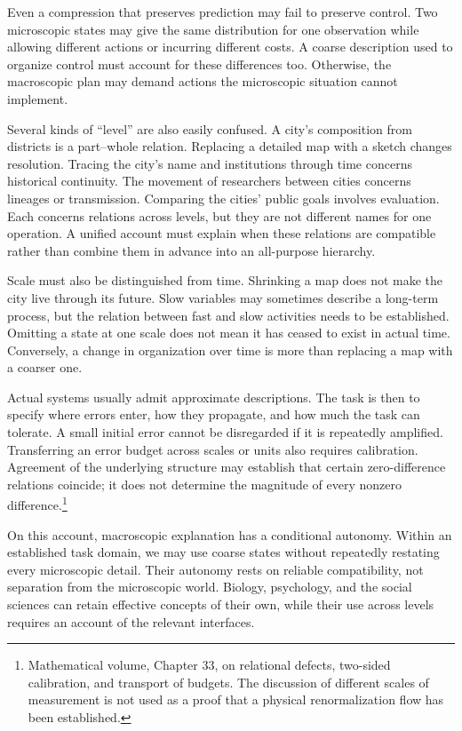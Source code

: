 \documentclass[
  english,
  11pt,
  oneside]{book}
\begin{document}
Even a compression that preserves prediction may fail to preserve control. Two microscopic states may give the same distribution for one observation while allowing different actions or incurring different costs. A coarse description used to organize control must account for these differences too. Otherwise, the macroscopic plan may demand actions the microscopic situation cannot implement.

Several kinds of ``level'' are also easily confused. A city's composition from districts is a part--whole relation. Replacing a detailed map with a sketch changes resolution. Tracing the city's name and institutions through time concerns historical continuity. The movement of researchers between cities concerns lineages or transmission. Comparing the cities' public goals involves evaluation. Each concerns relations across levels, but they are not different names for one operation. A unified account must explain when these relations are compatible rather than combine them in advance into an all-purpose hierarchy.

Scale must also be distinguished from time. Shrinking a map does not make the city live through its future. Slow variables may sometimes describe a long-term process, but the relation between fast and slow activities needs to be established. Omitting a state at one scale does not mean it has ceased to exist in actual time. Conversely, a change in organization over time is more than replacing a map with a coarser one.

Actual systems usually admit approximate descriptions. The task is then to specify where errors enter, how they propagate, and how much the task can tolerate. A small initial error cannot be disregarded if it is repeatedly amplified. Transferring an error budget across scales or units also requires calibration. Agreement of the underlying structure may establish that certain zero-difference relations coincide; it does not determine the magnitude of every nonzero difference.\footnote{\hypertarget{ph-note-43}{}Mathematical volume, Chapter 33, on relational defects, two-sided calibration, and transport of budgets. The discussion of different scales of measurement is not used as a proof that a physical renormalization flow has been established.}

On this account, macroscopic explanation has a conditional autonomy. Within an established task domain, we may use coarse states without repeatedly restating every microscopic detail. Their autonomy rests on reliable compatibility, not separation from the microscopic world. Biology, psychology, and the social sciences can retain effective concepts of their own, while their use across levels requires an account of the relevant interfaces.
\end{document}
